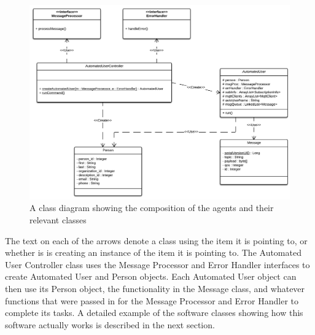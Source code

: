 \begin{figure}[H]
	\centering
	\includegraphics[width=\textwidth]{figures/automated_agent_class_diagram.png}
	\caption{A class diagram showing the composition of the agents and their relevant classes}
	\label{fig:automation_class_diagram}
\end{figure}

The text on each of the arrows denote a class using the item it is pointing to, or whether is is creating an instance of the item it is pointing to. The Automated User Controller class uses the Message Processor and Error Handler interfaces to create Automated User and Person objects. Each Automated User object can then use its Person object, the functionality in the Message class, and whatever functions that were passed in for the Message Processor and Error Handler to complete its tasks. A detailed example of the software classes showing how this software actually works is described in the next section.




